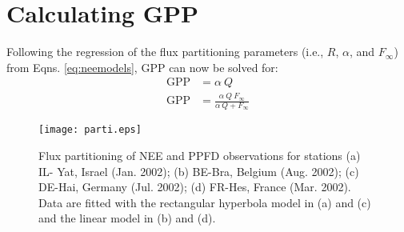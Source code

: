 \section{Calculating GPP}
\label{sec:calcgpp}
Following the regression of the flux partitioning parameters (i.e., $R$, $\alpha$, and $F_\infty$) from Eqns. \ref{eq:neemodels}, GPP can now be solved for:
\begin{subequations}
\label{eq:gppmod}
\begin{align}
    \text{GPP} &= \alpha\: Q \label{eq:gppl}\\
    \text{GPP} &= \frac{\alpha\: Q\: F_{\infty}}
                       {\alpha\: Q + F_{\infty}} \label{eq:gpph}
\end{align}
\end{subequations}
\begin{figure}[h!]
    \texttt{[image: parti.eps]}
    \caption{Flux partitioning of NEE and PPFD observations for stations (a) IL-
    Yat, Israel (Jan. 2002); (b) BE-Bra, Belgium (Aug. 2002); (c) DE-Hai, 
    Germany (Jul. 2002); (d) FR-Hes, France (Mar. 2002).  Data are fitted with 
    the rectangular hyperbola model in (a) and (c) and the linear model in (b) 
    and (d). }
    \label{fig:parti}
\end{figure}

